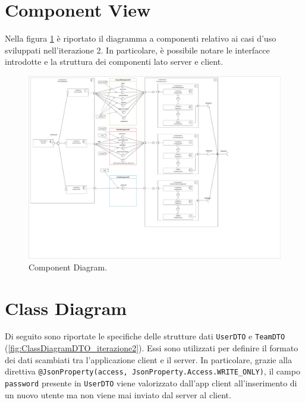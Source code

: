 \section{Component View}
Nella figura \ref{fig:ComponentDiagram_iterazione2} è riportato il diagramma a componenti relativo ai casi d'uso sviluppati nell'iterazione 2. In particolare, è possibile notare le interfacce introdotte e la struttura dei componenti lato server e client.

\begin{figure}[h!]
	\centering
	\includegraphics[width=1\linewidth]{./Iterazione 2/OtherFiles/UML - Component View}
	\caption{Component Diagram.}
	\label{fig:ComponentDiagram_iterazione2}
\end{figure}

\clearpage

\section{Class Diagram}
Di seguito sono riportate le specifiche delle strutture dati \texttt{UserDTO} e \texttt{TeamDTO} (\Fig\ref{fig:ClassDiagramDTO_iterazione2}). Essi sono utilizzati per definire il formato dei dati scambiati tra l'applicazione client e il server. In particolare, grazie alla direttiva \texttt{@JsonProperty(access, JsonProperty.Access.WRITE\_ONLY)}, il campo \texttt{password} presente in \texttt{UserDTO} viene valorizzato dall'app client all'inserimento di un nuovo utente ma non viene mai inviato dal server al client.  

